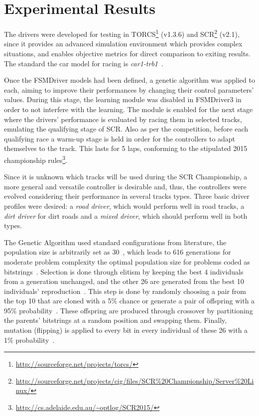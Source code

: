 \section{Experimental Results}\label{sec:4}%
The drivers were developed for testing in TORCS\footnote{\url{http://sourceforge.net/projects/torcs/}} (v1.3.6) and SCR\footnote{\url{http://sourceforge.net/projects/cig/files/SCR\%20Championship/Server\%20Linux/}} (v2.1), since it provides an advanced simulation environment which provides complex situations, and enables objective metrics for direct comparison to exiting results. The standard the car model for racing is \emph{car1-trb1}~\cite{SCR}.

Once the FSMDriver models had been defined, a genetic algorithm was applied to each, aiming to improve their performances by changing their control parameters' values. During this stage, the learning module was disabled in FSMDriver3 in order to not interfere with the learning. The module is enabled for the next stage where the drivers' performance is evaluated by racing them in selected tracks, emulating the qualifying stage of SCR. Also as per the competition, before each qualifying race a warm-up stage is held in order for the controllers to adapt themselves to the track. This lasts for 5 laps, conforming to the stipulated 2015 championship rules\footnote{\url{http://cs.adelaide.edu.au/~optlog/SCR2015/}}.

Since it is unknown which tracks will be used during the SCR Championship, a more general and versatile controller is desirable and, thus, the controllers were evolved considering their performance in several tracks types. Three basic driver profiles were desired: a \emph{road driver}, which would perform well in road tracks, a \emph{dirt driver} for dirt roads and a \emph{mixed driver}, which should perform well in both types.

The Genetic Algorithm used standard configurations from literature, the population size is arbitrarily set as 30~\cite{RATES}, which leads to 616 generations for moderate problem complexity the optimal population size for problems coded as bitstrings~\cite{218485}. Selection is done through elitism by keeping the best 4 individuals from a generation unchanged, and the other 26 are generated from the best 10 individuals' reproduction~\cite{ELITISM}. This step is done by randomly choosing a pair from the top 10 that are cloned with a 5\% chance or generate a pair of offspring with a 95\% probability~\cite{RATES}. These offspring are produced through crossover by partitioning the parents' bitstrings at a random position and swapping them. Finally, mutation (flipping) is applied to every bit in every individual of these 26 with a 1\% probability~\cite{RATES}.

